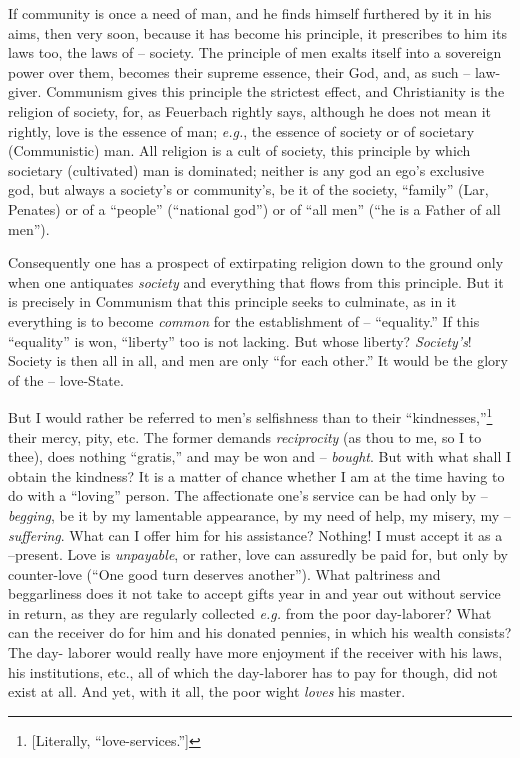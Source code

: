 \documentclass[12pt,a4paper]{book}
\begin{document}
If community is once a need of man, and he finds himself furthered by it in 
his aims, then very soon, because it has become his principle, it prescribes 
to him its laws too, the laws of -- society. The principle of men exalts 
itself into a sovereign power over them, becomes their supreme essence, their 
God, and, as such -- law-giver. Communism gives this principle the strictest 
effect, and Christianity is the religion of society, for, as Feuerbach rightly 
says, although he does not mean it rightly, love is the essence of man; 
\textit{e.g.}, the essence of society or of societary (Communistic) man. All 
religion is a cult of society, this principle by which societary (cultivated) 
man is dominated; neither is any god an ego's exclusive god, but always a 
society's or community's, be it of the society, ``family'' (Lar, Penates) or 
of a ``people'' (``national god'') or of ``all men'' (``he is a Father 
of all men'').

Consequently one has a prospect of extirpating religion down to the ground 
only when one antiquates \textit{society} and everything that flows from this 
principle. But it is precisely in Communism that this principle seeks to 
culminate, as in it everything is to become \textit{common} for the 
establishment of -- ``equality.'' If this ``equality'' is won, 
``liberty'' too is not lacking. But whose liberty? \textit{Society's}! 
Society is then all in all, and men are only ``for each other.'' It would be 
the glory of the -- love-State.

But I would rather be referred to men's selfishness than to their 
``kindnesses,''\footnote{[Literally, ``love-services.'']} their mercy, 
pity, etc. The former demands \textit{reciprocity} (as thou to me, so I to 
thee), does nothing ``gratis,'' and may be won and -- \textit{bought}. But 
with what shall I obtain the kindness? It is a matter of chance whether I am 
at the time having to do with a ``loving'' person. The affectionate one's 
service can be had only by -- \textit{begging}, be it by my lamentable 
appearance, by my need of help, my misery, my -- \textit{suffering}. What can 
I offer him for his assistance? Nothing! I must accept it as a --present. Love 
is \textit{unpayable}, or rather, love can assuredly be paid for, but only by 
counter-love (``One good turn deserves another''). What paltriness and 
beggarliness does it not take to accept gifts year in and year out without 
service in return, as they are regularly collected \textit{e.g.} from the 
poor day-laborer? What can the receiver do for him and his donated pennies, in 
which his wealth consists? The day- laborer would really have more enjoyment 
if the receiver with his laws, his institutions, etc., all of which the 
day-laborer has to pay for though, did not exist at all. And yet, with it all, 
the poor wight \textit{loves} his master.
\end{document}
